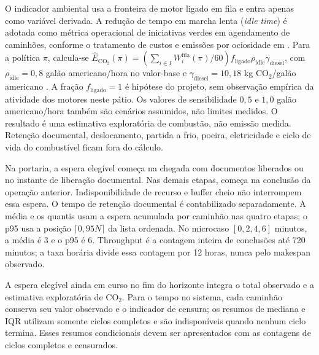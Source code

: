 \documentclass[
  12pt,
  oneside,
  a4paper,
  sumario=tradicional,
  brazil
]{abntex2}
\begin{document}
O indicador ambiental usa a fronteira de motor ligado em fila e entra apenas como vari\'avel derivada. A redu\c{c}\~ao de tempo em marcha lenta (\textit{idle time}) \'e adotada como m\'etrica operacional de iniciativas verdes em agendamento de caminh\~oes, conforme o tratamento de custos e emiss\~oes por ociosidade em \textcite{liDisruptionManagementTruck2018a}. Para a pol\'itica $\pi$, calcula-se $\widehat{E}_{\mathrm{CO_2}}(\pi)=\left(\sum_{i \in I} W_i^{\mathrm{fila}}(\pi)/60\right)f_{\mathrm{ligado}}\rho_{\mathrm{idle}}\gamma_{\mathrm{diesel}}$, com $\rho_{\mathrm{idle}}=0{,}8$ gal\~ao americano/hora no valor-base e $\gamma_{\mathrm{diesel}}=10{,}18$ kg $\mathrm{CO_2}$/gal\~ao americano \parencite{usdoeIdleFuelConsumption2015, usepaGreenhouseGasEquivalencies2026}. A fra\c{c}\~ao $f_{\mathrm{ligado}}=1$ \'e hip\'otese do projeto, sem observa\c{c}\~ao emp\'irica da atividade dos motores neste p\'atio. Os valores de sensibilidade $0{,}5$ e $1{,}0$ gal\~ao americano/hora tamb\'em s\~ao cen\'arios assumidos, n\~ao limites medidos. O resultado \'e uma estimativa explorat\'oria de combust\~ao, n\~ao emiss\~ao medida. Reten\c{c}\~ao documental, deslocamento, partida a frio, poeira, eletricidade e ciclo de vida do combust\'ivel ficam fora do c\'alculo.

Na portaria, a espera eleg\'ivel come\c{c}a na chegada com documentos liberados ou no instante de libera\c{c}\~ao documental. Nas demais etapas, come\c{c}a na conclus\~ao da opera\c{c}\~ao anterior. Indisponibilidade de recurso e buffer cheio n\~ao interrompem essa espera. O tempo de reten\c{c}\~ao documental \'e contabilizado separadamente. A m\'edia e os quantis usam a espera acumulada por caminh\~ao nas quatro etapas; o p95 usa a posi\c{c}\~ao $\lceil 0{,}95N\rceil$ da lista ordenada. No microcaso $[0,2,4,6]$ minutos, a m\'edia \'e 3 e o p95 \'e 6. Throughput \'e a contagem inteira de conclus\~oes at\'e 720 minutos; a taxa hor\'aria divide essa contagem por 12 horas, nunca pelo makespan observado.

A espera eleg\'ivel ainda em curso no fim do horizonte integra o total observado e a estimativa explorat\'oria de $\mathrm{CO_2}$. Para o tempo no sistema, cada caminh\~ao conserva seu valor observado e o indicador de censura; os resumos de mediana e IQR utilizam somente ciclos completos e s\~ao indispon\'iveis quando nenhum ciclo termina. Esses resumos condicionais devem ser apresentados com as contagens de ciclos completos e censurados.
\end{document}
